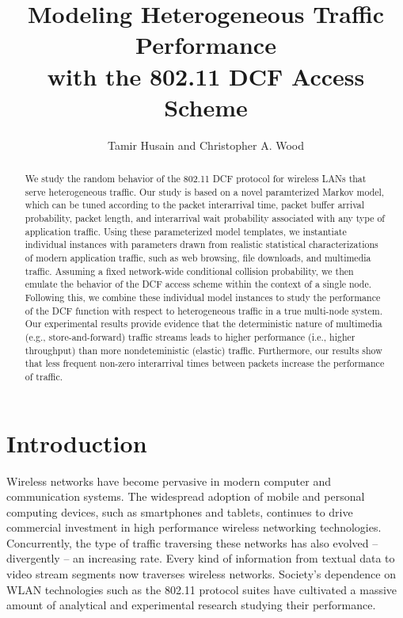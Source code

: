 \documentclass{llncs}
\begin{document}
\mainmatter
\title{Modeling Heterogeneous Traffic Performance \\ with the 802.11 DCF Access Scheme}
\author{Tamir Husain and Christopher A. Wood}
\maketitle

\begin{abstract}
We study the random behavior of the 802.11 DCF protocol for wireless LANs that serve heterogeneous traffic. Our study is based on a novel paramterized Markov model, which can be tuned according to the packet interarrival time, packet buffer arrival probability, packet length, and interarrival wait probability associated with any type of application traffic. Using these parameterized model templates, we instantiate individual instances with parameters drawn from realistic statistical characterizations of modern application traffic, such as web browsing, file downloads, and multimedia traffic. Assuming a fixed network-wide conditional collision probability, we then emulate the behavior of the DCF access scheme within the context of a single node. Following this, we combine these individual model instances to study the performance of the DCF function with respect to heterogeneous traffic in a true multi-node system. Our experimental results provide evidence that the deterministic nature of multimedia (e.g., store-and-forward) traffic streams leads to higher performance (i.e., higher throughput) than more nondeteministic (elastic) traffic. Furthermore, our results show that less frequent non-zero interarrival times between packets increase the performance of traffic.
\end{abstract}

\section{Introduction}
Wireless networks have become pervasive in modern computer and communication systems. The widespread adoption of mobile and personal computing devices, such as smartphones and tablets, continues to drive commercial investment in high performance wireless networking technologies. Concurrently, the type of traffic traversing these networks has also evolved -- divergently -- an increasing rate. Every kind of information from textual data to video stream segments now traverses wireless networks. Society's dependence on WLAN technologies such as the 802.11 protocol suites have cultivated a massive amount of analytical and experimental research studying their performance. 
\end{document}
